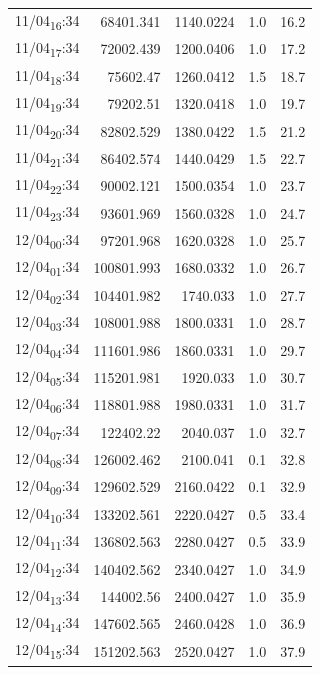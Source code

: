 \documentclass[11pt]{article}
\begin{document}
\begin{center}
\begin{tabular}{lrrrr}
11/04\textsubscript{16}:34 & 68401.341 & 1140.0224 & 1.0 & 16.2\\[0pt]
11/04\textsubscript{17}:34 & 72002.439 & 1200.0406 & 1.0 & 17.2\\[0pt]
11/04\textsubscript{18}:34 & 75602.47 & 1260.0412 & 1.5 & 18.7\\[0pt]
11/04\textsubscript{19}:34 & 79202.51 & 1320.0418 & 1.0 & 19.7\\[0pt]
11/04\textsubscript{20}:34 & 82802.529 & 1380.0422 & 1.5 & 21.2\\[0pt]
11/04\textsubscript{21}:34 & 86402.574 & 1440.0429 & 1.5 & 22.7\\[0pt]
11/04\textsubscript{22}:34 & 90002.121 & 1500.0354 & 1.0 & 23.7\\[0pt]
11/04\textsubscript{23}:34 & 93601.969 & 1560.0328 & 1.0 & 24.7\\[0pt]
12/04\textsubscript{00}:34 & 97201.968 & 1620.0328 & 1.0 & 25.7\\[0pt]
12/04\textsubscript{01}:34 & 100801.993 & 1680.0332 & 1.0 & 26.7\\[0pt]
12/04\textsubscript{02}:34 & 104401.982 & 1740.033 & 1.0 & 27.7\\[0pt]
12/04\textsubscript{03}:34 & 108001.988 & 1800.0331 & 1.0 & 28.7\\[0pt]
12/04\textsubscript{04}:34 & 111601.986 & 1860.0331 & 1.0 & 29.7\\[0pt]
12/04\textsubscript{05}:34 & 115201.981 & 1920.033 & 1.0 & 30.7\\[0pt]
12/04\textsubscript{06}:34 & 118801.988 & 1980.0331 & 1.0 & 31.7\\[0pt]
12/04\textsubscript{07}:34 & 122402.22 & 2040.037 & 1.0 & 32.7\\[0pt]
12/04\textsubscript{08}:34 & 126002.462 & 2100.041 & 0.1 & 32.8\\[0pt]
12/04\textsubscript{09}:34 & 129602.529 & 2160.0422 & 0.1 & 32.9\\[0pt]
12/04\textsubscript{10}:34 & 133202.561 & 2220.0427 & 0.5 & 33.4\\[0pt]
12/04\textsubscript{11}:34 & 136802.563 & 2280.0427 & 0.5 & 33.9\\[0pt]
12/04\textsubscript{12}:34 & 140402.562 & 2340.0427 & 1.0 & 34.9\\[0pt]
12/04\textsubscript{13}:34 & 144002.56 & 2400.0427 & 1.0 & 35.9\\[0pt]
12/04\textsubscript{14}:34 & 147602.565 & 2460.0428 & 1.0 & 36.9\\[0pt]
12/04\textsubscript{15}:34 & 151202.563 & 2520.0427 & 1.0 & 37.9\\[0pt]

\end{tabular}
\end{center}
\end{document}
